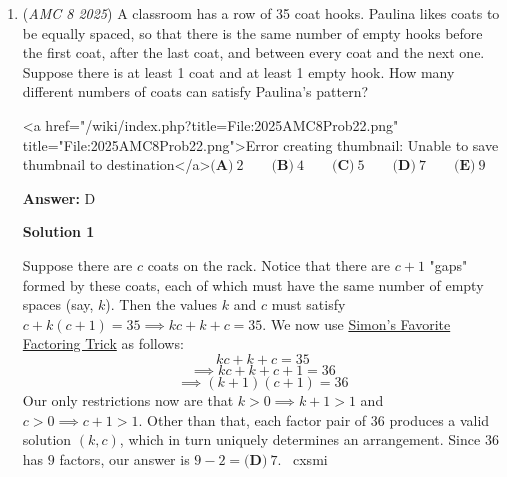 \begin{enumerate}
 



\textbf{Solution 3}

Notice $C$ has 5 nodes emerging from it and all other emergences are less than 5 hence $C$ must be 1. Then, $G$ is forced 2. Now, since $A,F$ are disconnected and have 4 nodes, which is the second maximum, we must lay 3 in the next letter that has maximal number of nodes, which is $B$. Now, $A,F$ are still disconnected, and since $E$ and $D$ share the same number of nodes, but $E$ and $F$ are connected, placing 4 in either $D$ yields no solution regardless, hence choose $E$. Then, $A$ is forced 5, so $D$ 6, and $F$ 7, yielding $C+E+F = \boxed{12}$.

 This is our first video posted on the AoPS website. Our goal is to help students learn more efficiently.

 


	\item (\textit{AMC 8 2025}) A classroom has a row of 35 coat hooks. Paulina likes coats to be equally spaced, so that there is the same number of empty hooks before the first coat, after the last coat, and between every coat and the next one. Suppose there is at least 1 coat and at least 1 empty hook. How many different numbers of coats can satisfy Paulina's pattern?


 <a href="/wiki/index.php?title=File:2025AMC8Prob22.png" title="File:2025AMC8Prob22.png">Error creating thumbnail: Unable to save thumbnail to destination</a>$\textbf{(A)}\ 2\qquad \textbf{(B)}\ 4\qquad \textbf{(C)}\ 5\qquad \textbf{(D)}\ 7\qquad \textbf{(E)}\ 9$

 \textbf{Answer: }D



\textbf{Solution 1}

Suppose there are $c$ coats on the rack. Notice that there are $c+1$ "gaps" formed by these coats, each of which must have the same number of empty spaces (say, $k$). Then the values $k$ and $c$ must satisfy $c+k(c+1)=35 \implies kc+k+c=35$. We now use \href{https://artofproblemsolving.com/wiki/index.php?title=Simon\%27s\_Favorite\_Factoring\_Trick}{Simon's Favorite Factoring Trick} as follows: 
 \[kc+k+c=35\] 
 \[\implies kc+k+c+1=36\] 
 \[\implies (k+1)(c+1)=36\] Our only restrictions now are that $k>0 \implies k+1 > 1$ and $c>0 \implies c+1>1$. Other than that, each factor pair of $36$ produces a valid solution $(k,c)$, which in turn uniquely determines an arrangement. Since $36$ has $9$ factors, our answer is $9-2=\boxed{\textbf{(D)}~7}$. ~cxsmi


\end{enumerate}
